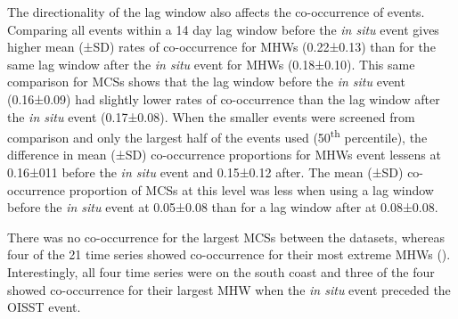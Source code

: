 \documentclass[a4paper,10pt,review]{elsarticle}
\begin{document}
The directionality of the lag window also affects the co-occurrence of events. Comparing all events within a 14 day lag window before the \emph{in situ} event gives higher mean (±SD) rates of co-occurrence for MHWs (0.22±0.13) than for the same lag window after the \emph{in situ} event for MHWs (0.18±0.10). This same comparison for MCSs shows that the lag window before the \emph{in situ} event (0.16±0.09) had slightly lower rates of co-occurrence than the lag window after the \emph{in situ} event (0.17±0.08). When the smaller events were screened from comparison and only the largest half of the events used (50\textsuperscript{th} percentile), the difference in mean (±SD) co-occurrence proportions for MHWs event lessens at 0.16±011 before the \emph{in situ} event and 0.15±0.12 after. The mean (±SD) co-occurrence proportion of MCSs at this level was less when using a lag window before the \emph{in situ} event at 0.05±0.08 than for a lag window after at 0.08±0.08.

There was no co-occurrence for the largest MCSs between the datasets, whereas four of the 21 time series showed co-occurrence for their most extreme MHWs (). Interestingly, all four time series were on the south coast and three of the four showed co-occurrence for their largest MHW when the \emph{in situ} event preceded the OISST event.
\end{document}
